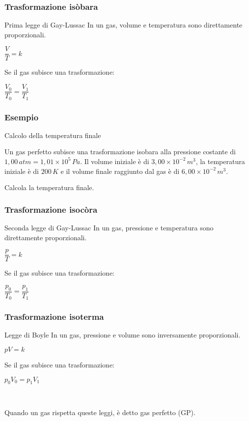 \documentclass[]{beamer}
\theoremstyle{plain}
\begin{document}
\begin{frame}
\frametitle{Trasformazione isòbara}
\begin{block}{Prima legge di Gay-Lussac}
In un gas, volume e temperatura sono direttamente proporzionali.
\begin{center}
$ \dfrac{V}{T} = k $
\end{center}\pause
Se il gas subisce una trasformazione:
\begin{center}
\colorbox{marroncino!30}{$ \dfrac{V_0}{T_0} = \dfrac{V_1}{T_1} $}
\end{center}
\end{block}
\end{frame}





\begin{frame}
\frametitle{Esempio}
\begin{exampleblock}{Calcolo della temperatura finale}
{\small Un gas perfetto subisce una trasformazione isobara alla pressione costante di $ 1,00 \, atm = 1,01 \times 10^5 \, Pa  $. Il volume iniziale è di $ 3,00 \times 10^{-2} \, m^3 $, la temperatura iniziale è di $ 200 \, K $ e il volume finale raggiunto dal gas è di $ 6,00 \times 10^{-2} \, m^3 $.

Calcola la temperatura finale.}
\end{exampleblock}
\end{frame}


\begin{frame}
\frametitle{Trasformazione isocòra}
\begin{block}{Seconda legge di Gay-Lussac}
In un gas, pressione e temperatura sono direttamente proporzionali.
\begin{center}
$ \dfrac{p}{T} = k $
\end{center}\pause
Se il gas subisce una trasformazione:
\begin{center}
\colorbox{marroncino!30}{$ \dfrac{p_0}{T_0} = \dfrac{p_1}{T_1} $}
\end{center}
\end{block}
\end{frame}



\begin{frame}
\frametitle{Trasformazione isoterma}
\begin{block}{Legge di Boyle}
In un gas, pressione e volume sono inversamente proporzionali.
\begin{center}
$ pV = k $
\end{center}\pause
Se il gas subisce una trasformazione:
\begin{center}
\colorbox{marroncino!30}{$ p_0 V_0 = p_1 V_1 $}
\end{center}
\end{block}\pause

~

Quando un gas rispetta queste leggi, è detto \alert{gas perfetto} (GP).
\end{frame}
\end{document}
